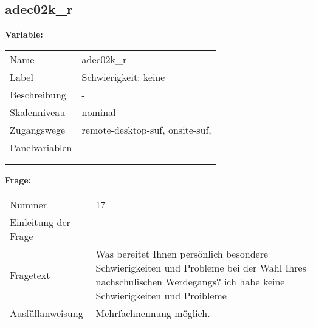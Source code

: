	
	
	\subsection{adec02k\_r}
	\label{subSection:adec02k_r}

	\noindent\textbf{Variable:}\\
		\begin{tabular}{lL{11.3cm}}
			\label{tableVariable:adec02k_r}
			Name & adec02k\_r \\
			Label & Schwierigkeit: keine \\
			Beschreibung & - \\
			Skalenniveau & nominal \\
			Zugangswege &
				remote-desktop-suf,
				onsite-suf,
 \\
			Panelvariablen & -
			 \\
			 \\
 \\
		\end{tabular}

		\vspace*{1 cm}
		\noindent\textbf{Frage:}\\
		\begin{tabular}{lL{11.3cm}}
			\label{tableQuestion:adec02k_r}
			Nummer & 17 \\
			Einleitung der Frage & - \\
			Fragetext & Was bereitet Ihnen persönlich besondere Schwierigkeiten und Probleme bei der Wahl Ihres nachschulischen Werdegangs?
ich habe keine Schwierigkeiten und Proibleme \\
			Ausfüllanweisung & Mehrfachnennung möglich. \\
		\end{tabular}





